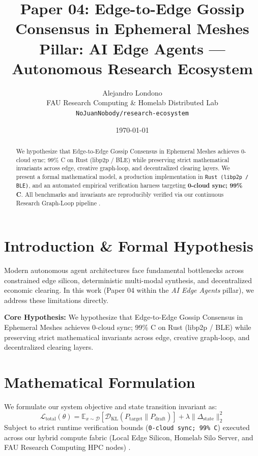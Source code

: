 \documentclass[10pt,twocolumn]{article}
\title{\textbf{Paper 04: Edge-to-Edge Gossip Consensus in Ephemeral Meshes}\\
\large Pillar: AI Edge Agents --- Autonomous Research Ecosystem}
\author{
  Alejandro Londono \\
  FAU Research Computing \& Homelab Distributed Lab \\
  \texttt{NoJuanNobody/research-ecosystem}
}
\date{\today}
\begin{document}
\maketitle

\begin{abstract}
We hypothesize that Edge-to-Edge Gossip Consensus in Ephemeral Meshes achieves 0-cloud sync; 99\% C on Rust (libp2p / BLE) while preserving strict mathematical invariants across edge, creative graph-loop, and decentralized clearing layers.
We present a formal mathematical model, a production implementation in \texttt{Rust (libp2p / BLE)}, and an automated empirical verification harness targeting \textbf{0-cloud sync; 99\% C}. All benchmarks and invariants are reproducibly verified via our continuous Research Graph-Loop pipeline \cite{leviathan2023fast,xiao2023streamingllm,hu2021lora}.
\end{abstract}

\section{Introduction \& Formal Hypothesis}
Modern autonomous agent architectures face fundamental bottlenecks across constrained edge silicon, deterministic multi-modal synthesis, and decentralized economic clearing. In this work (Paper 04 within the \textit{AI Edge Agents} pillar), we address these limitations directly.

\textbf{Core Hypothesis:} We hypothesize that Edge-to-Edge Gossip Consensus in Ephemeral Meshes achieves 0-cloud sync; 99\% C on Rust (libp2p / BLE) while preserving strict mathematical invariants across edge, creative graph-loop, and decentralized clearing layers.

\section{Mathematical Formulation}
We formulate our system objective and state transition invariant as:
\begin{equation}
\mathcal{L}_{\text{total}}(\theta) = \mathbb{E}_{x \sim \mathcal{D}}\left[\mathcal{D}_{\text{KL}}(P_{\text{target}} \parallel P_{\text{draft}})\right] + \lambda \|\Delta_{\text{state}}\|_2^2
\end{equation}
Subject to strict runtime verification bounds (\texttt{0-cloud sync; 99\% C}) executed across our hybrid compute fabric (Local Edge Silicon, Homelab Silo Server, and FAU Research Computing HPC nodes) \cite{rafailov2023dpo,shapley1953value,hanson2003combinatorial}.
\end{document}
